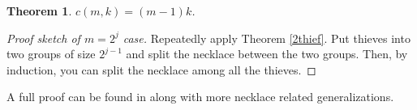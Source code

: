\documentclass[12pt]{amsart}
\newtheorem{thm}{Theorem}[section]
\theoremstyle{definition}
\begin{document}
    \begin{thm}
      $c(m,k) = (m-1)k$.
    \end{thm}

    \begin{proof}[Proof sketch of $m = 2^j$ case]
      Repeatedly apply Theorem \ref{2thief}. Put thieves into two groups of size $2^{j-1}$ and split the necklace between the two groups. Then, by induction, you can split the necklace among all the thieves.
    \end{proof}

    A full proof can be found in \cite{alon} along with more necklace related generalizations.
    
    
    
    
\end{document}
